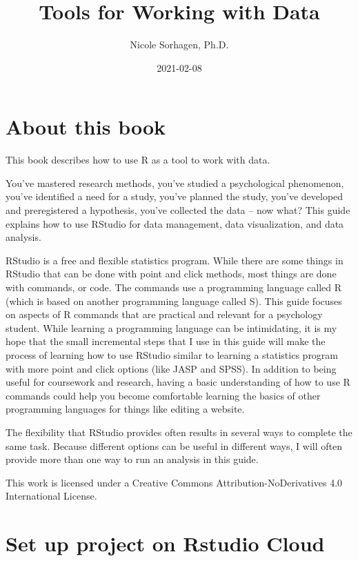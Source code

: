 \documentclass[
]{book}
\title{Tools for Working with Data}
\author{Nicole Sorhagen, Ph.D.}
\date{2021-02-08}
\begin{document}
\maketitle

{
\setcounter{tocdepth}{1}
\tableofcontents
}
\hypertarget{about-this-book}{%
\chapter{About this book}\label{about-this-book}}

This book describes how to use R as a tool to work with data.

You've mastered research methods, you've studied a psychological phenomenon, you've identified a need for a study, you've planned the study, you've developed and preregistered a hypothesis, you've collected the data -- now what? This guide explains how to use RStudio for data management, data visualization, and data analysis.

RStudio is a free and flexible statistics program. While there are some things in RStudio that can be done with point and click methods, most things are done with commands, or code. The commands use a programming language called R (which is based on another programming language called S). This guide focuses on aspects of R commands that are practical and relevant for a psychology student. While learning a programming language can be intimidating, it is my hope that the small incremental steps that I use in this guide will make the process of learning how to use RStudio similar to learning a statistics program with more point and click options (like JASP and SPSS). In addition to being useful for coursework and research, having a basic understanding of how to use R commands could help you become comfortable learning the basics of other programming languages for things like editing a website.

The flexibility that RStudio provides often results in several ways to complete the same task. Because different options can be useful in different ways, I will often provide more than one way to run an analysis in this guide.

This work is licensed under a Creative Commons Attribution-NoDerivatives 4.0 International License.

\hypertarget{set-up-project-on-rstudio-cloud}{%
\chapter{Set up project on Rstudio Cloud}\label{set-up-project-on-rstudio-cloud}}
\end{document}
